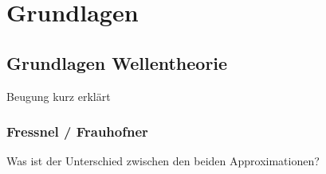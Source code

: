 %
%
%
%
\section{Grundlagen\label{opt:section:grundlagen}}

\subsection{Grundlagen Wellentheorie}
Beugung kurz erklärt

\subsubsection{Fressnel / Frauhofner}
Was ist der Unterschied zwischen den beiden Approximationen?

